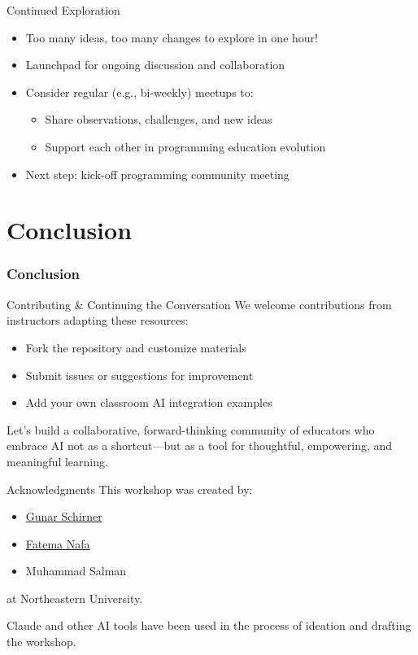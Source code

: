 \documentclass[xcolor=dvipsnames, aspectratio=169]{beamer}
\begin{document}
\begin{frame}{Continued Exploration}
  \begin{itemize}
    \item Too many ideas, too many changes to explore in one hour!
    \item Launchpad for ongoing discussion and collaboration
    \item Consider regular (e.g., bi-weekly) meetups to:
      \begin{itemize}
        \item Share observations, challenges, and new ideas
        \item Support each other in programming education evolution
      \end{itemize}
    \item Next step: kick-off programming community meeting
  \end{itemize}
\end{frame}

\part[Conclusion]{Conclusion}
\section{Conclusion}

\begin{frame}{Contributing \& Continuing the Conversation}
  We welcome contributions from instructors adapting these resources:
  \begin{itemize}
    \item Fork the repository and customize materials
    \item Submit issues or suggestions for improvement
    \item Add your own classroom AI integration examples
  \end{itemize}
  
  Let's build a collaborative, forward-thinking community of educators who embrace AI not as a shortcut—but as a tool for thoughtful, empowering, and meaningful learning.
\end{frame}

\begin{frame}{Acknowledgments}
  This workshop was created by:
  \begin{itemize}
    \item \href{https://coe.northeastern.edu/people/schirner-gunar/}{Gunar Schirner}
    \item \href{https://coe.northeastern.edu/people/nafa-fatema/}{Fatema Nafa}
    \item Muhammad Salman
  \end{itemize}
  
  at Northeastern University.
  
  \vspace{1em}
  
  Claude and other AI tools have been used in the process of ideation and drafting the workshop.
\end{frame}
\end{document}
